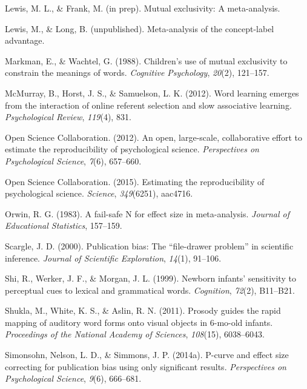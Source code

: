 \documentclass[english,floatsintext,man]{apa6}
\theoremstyle{definition}
\theoremstyle{definition}
\theoremstyle{remark}
\begin{document}
\hypertarget{ref-lfprep}{}
Lewis, M. L., \& Frank, M. (in prep). Mutual exclusivity: A
meta-analysis.

\hypertarget{ref-lewisunpublished}{}
Lewis, M., \& Long, B. (unpublished). Meta-analysis of the concept-label
advantage.

\hypertarget{ref-markman1988}{}
Markman, E., \& Wachtel, G. (1988). Children's use of mutual exclusivity
to constrain the meanings of words. \emph{Cognitive Psychology},
\emph{20}(2), 121--157.

\hypertarget{ref-mcmurray2012word}{}
McMurray, B., Horst, J. S., \& Samuelson, L. K. (2012). Word learning
emerges from the interaction of online referent selection and slow
associative learning. \emph{Psychological Review}, \emph{119}(4), 831.

\hypertarget{ref-open2012open}{}
Open Science Collaboration. (2012). An open, large-scale, collaborative
effort to estimate the reproducibility of psychological science.
\emph{Perspectives on Psychological Science}, \emph{7}(6), 657--660.

\hypertarget{ref-open2015estimating}{}
Open Science Collaboration. (2015). Estimating the reproducibility of
psychological science. \emph{Science}, \emph{349}(6251), aac4716.

\hypertarget{ref-orwin1983fail}{}
Orwin, R. G. (1983). A fail-safe N for effect size in meta-analysis.
\emph{Journal of Educational Statistics}, 157--159.

\hypertarget{ref-scargle1999publication}{}
Scargle, J. D. (2000). Publication bias: The ``file-drawer problem'' in
scientific inference. \emph{Journal of Scientific Exploration},
\emph{14}(1), 91--106.

\hypertarget{ref-shi1999newborn}{}
Shi, R., Werker, J. F., \& Morgan, J. L. (1999). Newborn infants'
sensitivity to perceptual cues to lexical and grammatical words.
\emph{Cognition}, \emph{72}(2), B11--B21.

\hypertarget{ref-shukla2011prosody}{}
Shukla, M., White, K. S., \& Aslin, R. N. (2011). Prosody guides the
rapid mapping of auditory word forms onto visual objects in 6-mo-old
infants. \emph{Proceedings of the National Academy of Sciences},
\emph{108}(15), 6038--6043.

\hypertarget{ref-simonsohn2014power}{}
Simonsohn, Nelson, L. D., \& Simmons, J. P. (2014a). P-curve and effect
size correcting for publication bias using only significant results.
\emph{Perspectives on Psychological Science}, \emph{9}(6), 666--681.
\end{document}
